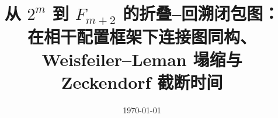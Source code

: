 \documentclass[11pt,letterpaper]{ctexart}
\title{从 $2^{m}$ 到 $F_{m+2}$ 的折叠--回溯闭包图：\\在相干配置框架下连接图同构、Weisfeiler--Leman 塌缩与 Zeckendorf 截断时间}
\author{}
\date{\today}
\begin{document}
\maketitle












\FloatBarrier
\appendix


\FloatBarrier

\end{document}
